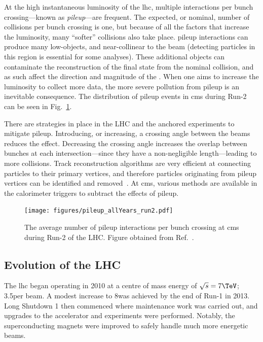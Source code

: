 At the high instantaneous luminosity of the \acrshort{lhc}, multiple interactions per bunch crossing---known as \emph{\gls{pileup}}---are frequent. The expected, or nominal, number of collisions per bunch crossing is one, but because of all the factors that increase the luminosity, many ``softer'' collisions also take place. \Gls{pileup} interactions can produce many low-\pt objects, and near-collinear to the beam (detecting particles in this region is essential for some analyses). These additional objects can contaminate the reconstruction of the final state from the nominal collision, and as such affect the direction and magnitude of the \ptvecmiss. When one aims to increase the luminosity to collect more data, the more severe pollution from \gls{pileup} is an inevitable consequence. The distribution of \gls{pileup} events in \acrshort{cms} during Run-2 can be seen in Fig.~\ref{fig:detector_cms_pileup}.

There are strategies in place in the LHC and the anchored experiments to mitigate \gls{pileup}. Introducing, or increasing, a crossing angle between the beams reduces the effect. Decreasing the crossing angle increases the overlap between bunches at each intersection---since they have a non-negligible length---leading to more collisions. Track reconstruction algorithms are very efficient at connecting particles to their primary vertices, and therefore particles originating from \gls{pileup} vertices can be identified and removed~\cite{Chatrchyan:2014fea,Aaboud:2017all}. At \acrshort{cms}, various methods are available in the calorimeter triggers to subtract the effects of \gls{pileup}.

\begin{figure}[htbp]
    \centering
    \texttt{[image: figures/pileup\_allYears\_run2.pdf]}
    \caption[The average number of pileup interactions per bunch crossing at CMS during Run-2 of the LHC]{The average number of \gls{pileup} interactions per bunch crossing at \acrshort{cms} during Run-2 of the LHC. Figure obtained from Ref.~.}
    \label{fig:detector_cms_pileup}
\end{figure}




\subsection{Evolution of the LHC}
\label{subsec:evolution_lhc}

The \acrshort{lhc} began operating in 2010 at a centre of mass energy of $\sqrt{s} = \text{7}\TeV$; 3.5\TeV per beam. A modest increase to 8\TeV was achieved by the end of Run-1 in 2013. Long Shutdown 1 then commenced where maintenance work was carried out, and upgrades to the accelerator and experiments were performed. Notably, the superconducting magnets were improved to safely handle much more energetic beams.

